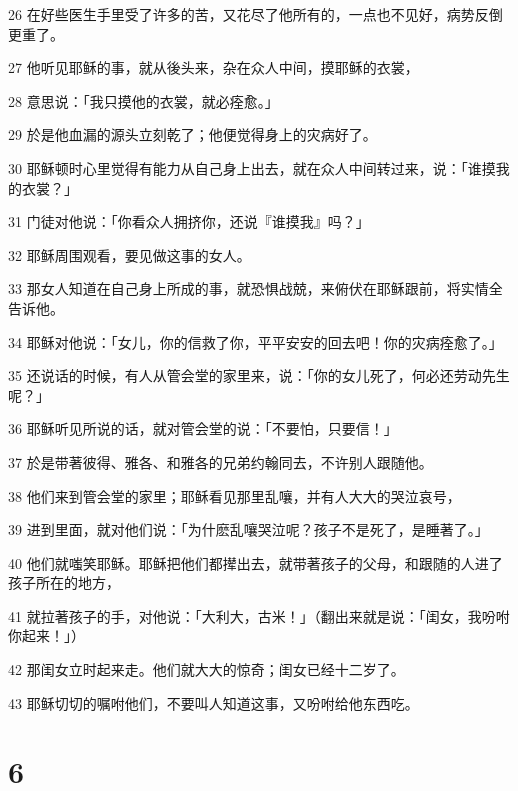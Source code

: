 \par 26 在好些医生手里受了许多的苦，又花尽了他所有的，一点也不见好，病势反倒更重了。
\par 27 他听见耶稣的事，就从後头来，杂在众人中间，摸耶稣的衣裳，
\par 28 意思说：「我只摸他的衣裳，就必痊愈。」
\par 29 於是他血漏的源头立刻乾了；他便觉得身上的灾病好了。
\par 30 耶稣顿时心里觉得有能力从自己身上出去，就在众人中间转过来，说：「谁摸我的衣裳？」
\par 31 门徒对他说：「你看众人拥挤你，还说『谁摸我』吗？」
\par 32 耶稣周围观看，要见做这事的女人。
\par 33 那女人知道在自己身上所成的事，就恐惧战兢，来俯伏在耶稣跟前，将实情全告诉他。
\par 34 耶稣对他说：「女儿，你的信救了你，平平安安的回去吧！你的灾病痊愈了。」
\par 35 还说话的时候，有人从管会堂的家里来，说：「你的女儿死了，何必还劳动先生呢？」
\par 36 耶稣听见所说的话，就对管会堂的说：「不要怕，只要信！」
\par 37 於是带著彼得、雅各、和雅各的兄弟约翰同去，不许别人跟随他。
\par 38 他们来到管会堂的家里；耶稣看见那里乱嚷，并有人大大的哭泣哀号，
\par 39 进到里面，就对他们说：「为什麽乱嚷哭泣呢？孩子不是死了，是睡著了。」
\par 40 他们就嗤笑耶稣。耶稣把他们都撵出去，就带著孩子的父母，和跟随的人进了孩子所在的地方，
\par 41 就拉著孩子的手，对他说：「大利大，古米！」（翻出来就是说：「闺女，我吩咐你起来！」）
\par 42 那闺女立时起来走。他们就大大的惊奇；闺女已经十二岁了。
\par 43 耶稣切切的嘱咐他们，不要叫人知道这事，又吩咐给他东西吃。

\chapter{6}

